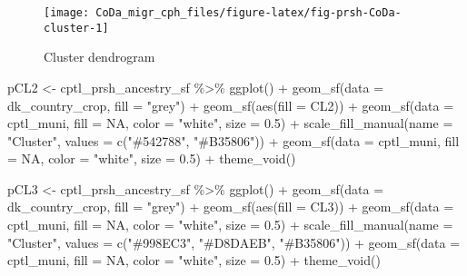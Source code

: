 \documentclass[
  12pt,
]{article}
\newenvironment{Shaded}{\begin{snugshade}}{\end{snugshade}}
\newcommand{\AttributeTok}[1]{\textcolor[rgb]{0.77,0.63,0.00}{#1}}
\newcommand{\ConstantTok}[1]{\textcolor[rgb]{0.00,0.00,0.00}{#1}}
\newcommand{\FloatTok}[1]{\textcolor[rgb]{0.00,0.00,0.81}{#1}}
\newcommand{\FunctionTok}[1]{\textcolor[rgb]{0.00,0.00,0.00}{#1}}
\newcommand{\NormalTok}[1]{#1}
\newcommand{\OtherTok}[1]{\textcolor[rgb]{0.56,0.35,0.01}{#1}}
\newcommand{\SpecialCharTok}[1]{\textcolor[rgb]{0.00,0.00,0.00}{#1}}
\newcommand{\StringTok}[1]{\textcolor[rgb]{0.31,0.60,0.02}{#1}}
\begin{document}
\begin{figure}[H]

{\centering \texttt{[image: CoDa\_migr\_cph\_files/figure-latex/fig-prsh-CoDa-cluster-1]} 

}

\caption{Cluster dendrogram}\label{fig:fig-prsh-CoDa-cluster}
\end{figure}

\begin{Shaded}
\begin{Highlighting}[]
\NormalTok{pCL2 }\OtherTok{\textless{}{-}}\NormalTok{ cptl\_prsh\_ancestry\_sf }\SpecialCharTok{\%\textgreater{}\%} 
  \FunctionTok{ggplot}\NormalTok{() }\SpecialCharTok{+}
  \FunctionTok{geom\_sf}\NormalTok{(}\AttributeTok{data =}\NormalTok{ dk\_country\_crop, }\AttributeTok{fill =} \StringTok{"grey"}\NormalTok{) }\SpecialCharTok{+}
  \FunctionTok{geom\_sf}\NormalTok{(}\FunctionTok{aes}\NormalTok{(}\AttributeTok{fill =}\NormalTok{ CL2)) }\SpecialCharTok{+}
  \FunctionTok{geom\_sf}\NormalTok{(}\AttributeTok{data =}\NormalTok{ cptl\_muni, }\AttributeTok{fill =} \ConstantTok{NA}\NormalTok{, }\AttributeTok{color =} \StringTok{"white"}\NormalTok{, }\AttributeTok{size =} \FloatTok{0.5}\NormalTok{) }\SpecialCharTok{+}
  \FunctionTok{scale\_fill\_manual}\NormalTok{(}\AttributeTok{name =} \StringTok{"Cluster"}\NormalTok{,}
                    \AttributeTok{values =} \FunctionTok{c}\NormalTok{(}\StringTok{"\#542788"}\NormalTok{,}
                               \StringTok{"\#B35806"}\NormalTok{)) }\SpecialCharTok{+}
  \FunctionTok{geom\_sf}\NormalTok{(}\AttributeTok{data =}\NormalTok{ cptl\_muni, }\AttributeTok{fill =} \ConstantTok{NA}\NormalTok{, }\AttributeTok{color =} \StringTok{"white"}\NormalTok{, }\AttributeTok{size =} \FloatTok{0.5}\NormalTok{) }\SpecialCharTok{+}
  \FunctionTok{theme\_void}\NormalTok{()}

\NormalTok{pCL3 }\OtherTok{\textless{}{-}}\NormalTok{ cptl\_prsh\_ancestry\_sf }\SpecialCharTok{\%\textgreater{}\%} 
  \FunctionTok{ggplot}\NormalTok{() }\SpecialCharTok{+}
  \FunctionTok{geom\_sf}\NormalTok{(}\AttributeTok{data =}\NormalTok{ dk\_country\_crop, }\AttributeTok{fill =} \StringTok{"grey"}\NormalTok{) }\SpecialCharTok{+}
  \FunctionTok{geom\_sf}\NormalTok{(}\FunctionTok{aes}\NormalTok{(}\AttributeTok{fill =}\NormalTok{ CL3)) }\SpecialCharTok{+}
  \FunctionTok{geom\_sf}\NormalTok{(}\AttributeTok{data =}\NormalTok{ cptl\_muni, }\AttributeTok{fill =} \ConstantTok{NA}\NormalTok{, }\AttributeTok{color =} \StringTok{"white"}\NormalTok{, }\AttributeTok{size =} \FloatTok{0.5}\NormalTok{) }\SpecialCharTok{+}
  \FunctionTok{scale\_fill\_manual}\NormalTok{(}\AttributeTok{name =} \StringTok{"Cluster"}\NormalTok{,}
                    \AttributeTok{values =} \FunctionTok{c}\NormalTok{(}\StringTok{"\#998EC3"}\NormalTok{,}
                               \StringTok{"\#D8DAEB"}\NormalTok{,}
                               \StringTok{"\#B35806"}\NormalTok{)) }\SpecialCharTok{+}
  \FunctionTok{geom\_sf}\NormalTok{(}\AttributeTok{data =}\NormalTok{ cptl\_muni, }\AttributeTok{fill =} \ConstantTok{NA}\NormalTok{, }\AttributeTok{color =} \StringTok{"white"}\NormalTok{, }\AttributeTok{size =} \FloatTok{0.5}\NormalTok{) }\SpecialCharTok{+}
  \FunctionTok{theme\_void}\NormalTok{()}


\end{Highlighting}
\end{Shaded}
\end{document}

